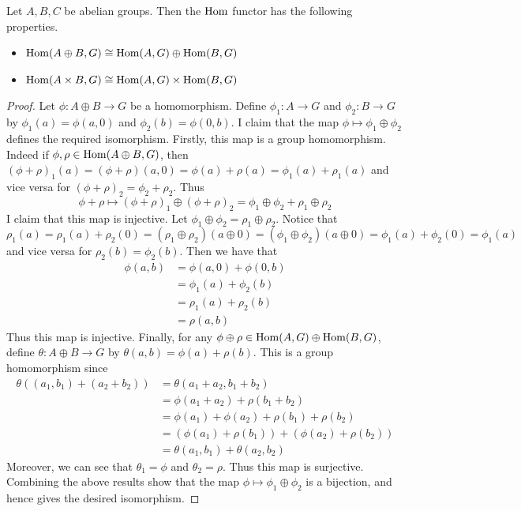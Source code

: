 \documentclass[a4paper]{article}
\begin{document}
\begin{prp}{}{} Let $A,B,C$ be abelian groups. Then the $\operatorname{Hom}$ functor has the following properties. 
\begin{itemize}
\item $\operatorname{Hom}(A\oplus B,G)\cong\operatorname{Hom}(A,G)\oplus\operatorname{Hom}(B,G)$
\item $\operatorname{Hom}(A\times B,G)\cong\operatorname{Hom}(A,G)\times\operatorname{Hom}(B,G)$
\end{itemize} \tcbline
\begin{proof}
Let $\phi:A\oplus B\to G$ be a homomorphism. Define $\phi_1:A\to G$ and $\phi_2:
B\to G$ by $\phi_1(a)=\phi(a,0)$ and $\phi_2(b)=\phi(0,b)$. I claim that the map $\phi\mapsto\phi_1\oplus\phi_2$ defines the required isomorphism. Firstly, this map is a group homomorphism. Indeed if $\phi,\rho\in\operatorname{Hom}(A\oplus B,G)$, then $(\phi+\rho)_1(a)=(\phi+\rho)(a,0)=\phi(a)+\rho(a)=\phi_1(a)+\rho_1(a)$ and vice versa for $(\phi+\rho)_2=\phi_2+\rho_2$. Thus $$\phi+\rho\mapsto(\phi+\rho)_1\oplus(\phi+\rho)_2=\phi_1\oplus\phi_2+\rho_1\oplus\rho_2$$ I claim that this map is injective. Let $\phi_1\oplus\phi_2=\rho_1\oplus\rho_2$. Notice that $$\rho_1(a)=\rho_1(a)+\rho_2(0)=(\rho_1\oplus\rho_2)(a\oplus 0)=(\phi_1\oplus\phi_2)(a\oplus 0)=\phi_1(a)+\phi_2(0)=\phi_1(a)$$ and vice versa for $\rho_2(b)=\phi_2(b)$. Then we have that 
\begin{align*}
\phi(a,b)&=\phi(a,0)+\phi(0,b)\\
&=\phi_1(a)+\phi_2(b)\\
&=\rho_1(a)+\rho_2(b)\\
&=\rho(a,b)
\end{align*}
Thus this map is injective. Finally, for any $\phi\oplus\rho\in\operatorname{Hom}(A,G)\oplus\operatorname{Hom}(B,G)$, define $\theta:A\oplus B\to G$ by $\theta(a,b)=\phi(a)+\rho(b)$. This is a group homomorphism since 
\begin{align*}
\theta((a_1,b_1)+(a_2+b_2))&=\theta(a_1+a_2,b_1+b_2)\\
&=\phi(a_1+a_2)+\rho(b_1+b_2)\\
&=\phi(a_1)+\phi(a_2)+\rho(b_1)+\rho(b_2)\\
&=(\phi(a_1)+\rho(b_1))+(\phi(a_2)+\rho(b_2))\\
&=\theta(a_1,b_1)+\theta(a_2,b_2)
\end{align*}
Moreover, we can see that $\theta_1=\phi$ and $\theta_2=\rho$. Thus this map is surjective. Combining the above results show that the map $\phi\mapsto\phi_1\oplus\phi_2$ is a bijection, and hence gives the desired isomorphism. 
\end{proof}
\end{prp}
\end{document}
